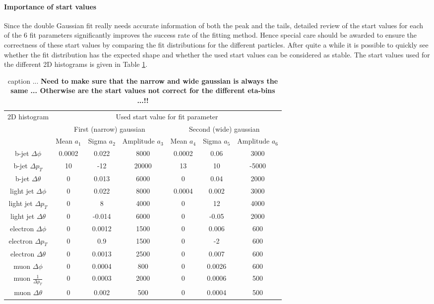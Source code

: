 \paragraph{Importance of start values\\} Since the double Gaussian fit really needs accurate information of both the peak and the tails, detailed review of the start values for each of the $6$ fit parameters significantly improves the success rate of the fitting method. Hence special care should be awarded to ensure the correctness of these start values by comparing the fit distributions for the different particles.%
After quite a while it is possible to quickly see whether the fit distribution has the expected shape and whether the used start values can be considered as stable. The start values used for the different 2D histograms is given in Table \ref{table::StartValues}.
\begin{table}[h!]
 \centering
 \begin{tabular}{|c|c|c|c|c|c|c|}
  \hline
  \multirow{2}{*}{2D histogram}	& \multicolumn{6}{|c|}{Used start value for fit parameter}	  	\\
				& \multicolumn{3}{|c}{First (narrow) gaussian} 		& \multicolumn{3}{c|}{Second (wide) gaussian}		\\
				&  Mean $a_1$	& Sigma $a_2$ 	& Amplitude $a_3$ 	& Mean $a_4$ 	& Sigma $a_5$ 	& Amplitude $a_6$ 	\\
  \hline
    b-jet $\Delta \phi$ 	& 0.0002	& 0.022		&	8000		& 0.0002	& 0.06		&	3000		\\
    b-jet $\Delta p_T$ 		& 10		& -12		&	20000		& 13		& 10		&	-5000		\\
    b-jet $\Delta \theta$  	& 0		& 0.013		&	6000		& 0		& 0.04		&	2000		\\
  \hline
    light jet $\Delta \phi$  	& 0		& 0.022		&	8000		& 0.0004	& 0.002		&	3000		\\
    light jet $\Delta p_T$  	& 0		& 8		&	4000		& 0		& 12		&	4000		\\
    light jet $\Delta \theta$ 	& 0		& -0.014	&	6000		& 0		& -0.05		&	2000		\\
  \hline 
    electron $\Delta \phi$ 	& 0		& 0.0012	&	1500		& 0		& 0.006		& 	600 		\\
    electron $\Delta p_T$  	& 0		& 0.9		&	1500		& 0		& -2		& 	600		\\
    electron $\Delta \theta$ 	& 0		& 0.0013	&	2500		& 0		& 0.007		& 	600		\\
  \hline
    muon $\Delta \phi$ 		& 0		& 0.0004	&	800		& 0		& 0.0026	& 	600		\\
    muon $\frac{1}{\Delta p_T}$ & 0		& 0.0003	& 	2000		& 0		& 0.0006	&	500		\\
    muon $\Delta \theta$ 	& 0		& 0.002		& 	500		& 0		& 0.0004	&	500		\\
  \hline
 \end{tabular} 
 \caption{caption ... \textbf{Need to make sure that the narrow and wide gaussian is always the same ... Otherwise are the start values not correct for the different eta-bins ...!!} } \label{table::StartValues}
\end{table}

